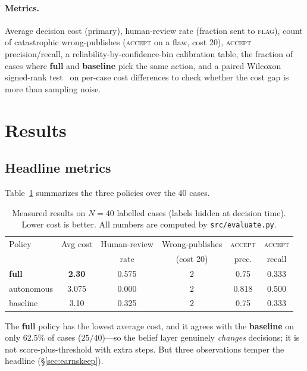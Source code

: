 \documentclass[11pt]{article}
\begin{document}
\paragraph{Metrics.} Average decision cost (primary), human-review rate (fraction sent
to \textsc{flag}), count of catastrophic wrong-publishes (\textsc{accept} on a flaw,
cost 20), \textsc{accept} precision/recall, a reliability-by-confidence-bin calibration
table, the fraction of cases where \textbf{full} and \textbf{baseline} pick the same
action, and a paired Wilcoxon signed-rank test~\cite{wilcoxon1945} on per-case cost
differences to check whether the cost gap is more than sampling noise.

\section{Results}
\label{sec:results}

\subsection{Headline metrics}
Table~\ref{tab:results} summarizes the three policies over the 40 cases.

\begin{table}[h]
\centering
\caption{Measured results on $N=40$ labelled cases (labels hidden at decision time).
Lower cost is better. All numbers are computed by \texttt{src/evaluate.py}.}
\label{tab:results}
\small
\begin{tabular}{@{}l ccccc@{}}
\toprule
Policy & Avg cost & Human-review & Wrong-publishes & \textsc{accept} & \textsc{accept} \\
 & & rate & (cost 20) & prec. & recall \\
\midrule
\textbf{full}   & \textbf{2.30} & 0.575 & 2 & 0.75  & 0.333 \\
autonomous      & 3.075         & 0.000 & 2 & 0.818 & 0.500 \\
baseline        & 3.10          & 0.325 & 2 & 0.75  & 0.333 \\
\bottomrule
\end{tabular}
\end{table}

\noindent
The \textbf{full} policy has the lowest average cost, and it agrees with the
\textbf{baseline} on only $62.5\%$ of cases ($25/40$)---so the belief layer genuinely
\emph{changes} decisions; it is not score-plus-threshold with extra steps. But three
observations temper the headline (\S\ref{sec:earnskeep}).
\end{document}
